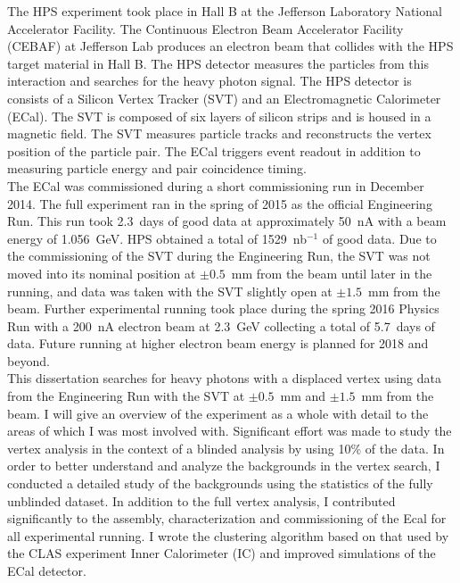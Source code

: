 The HPS experiment took place in Hall B at the Jefferson Laboratory National Accelerator Facility. The Continuous Electron Beam Accelerator Facility (CEBAF) at Jefferson Lab produces an electron beam that collides with the HPS target material in Hall B. The HPS detector measures the particles from this interaction and searches for the heavy photon signal. The HPS detector is consists of a Silicon Vertex Tracker (SVT) and an Electromagnetic Calorimeter (ECal). The SVT is composed of six layers of silicon strips and is housed in a magnetic field. The SVT measures particle tracks and reconstructs the vertex position of the particle pair. The ECal triggers event readout in addition to measuring particle energy and pair coincidence timing. \\
\indent The ECal was commissioned during a short commissioning run in December 2014. The full experiment ran in the spring of 2015 as the official Engineering Run. This run took 2.3~days of good data at approximately 50~nA with a beam energy of 1.056~GeV. HPS obtained a total of 1529~nb$^{-1}$ of good data. Due to the commissioning of the SVT during the Engineering Run, the SVT was not moved into its nominal position at $\pm0.5$~mm from the beam until later in the running, and data was taken with the SVT slightly open at $\pm1.5$~mm from the beam.  Further experimental running took place during the spring 2016 Physics Run with a 200~nA electron beam at 2.3~GeV collecting a total of 5.7~days of data.  Future running at higher electron beam energy is planned for 2018 and beyond.\\
\indent This dissertation searches for heavy photons with a displaced vertex using data from the Engineering Run with the SVT at $\pm0.5$~mm and $\pm1.5$~mm from the beam. I will give an overview of the experiment as a whole with detail to the areas of which I was most involved with. Significant effort was made to study the vertex analysis in the context of a blinded analysis by using 10$\%$ of the data. In order to better understand and analyze the backgrounds in the vertex search, I conducted a detailed study of the backgrounds using the statistics of the fully unblinded dataset. In addition to the full vertex analysis, I contributed significantly to the assembly, characterization and commissioning of the Ecal for all experimental running. I wrote the clustering algorithm based on that used by the CLAS experiment Inner Calorimeter (IC) and improved simulations of the ECal detector. 
